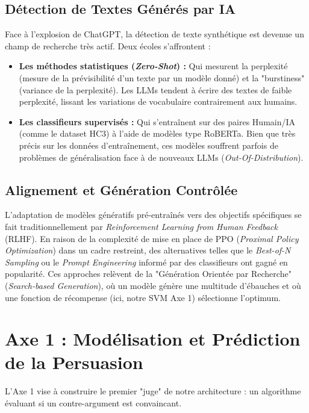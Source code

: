 \documentclass[11pt,a4paper]{article}
\begin{document}
\subsection{Détection de Textes Générés par IA}
Face à l'explosion de ChatGPT, la détection de texte synthétique est devenue un champ de recherche très actif. Deux écoles s'affrontent :
\begin{itemize}
    \item \textbf{Les méthodes statistiques (\textit{Zero-Shot}) :} Qui mesurent la perplexité (mesure de la prévisibilité d'un texte par un modèle donné) et la "burstiness" (variance de la perplexité). Les LLMs tendent à écrire des textes de faible perplexité, lissant les variations de vocabulaire contrairement aux humains.
    \item \textbf{Les classifieurs supervisés :} Qui s'entraînent sur des paires Humain/IA (comme le dataset HC3) à l'aide de modèles type RoBERTa. Bien que très précis sur les données d'entraînement, ces modèles souffrent parfois de problèmes de généralisation face à de nouveaux LLMs (\textit{Out-Of-Distribution}).
\end{itemize}

\subsection{Alignement et Génération Contrôlée}
L'adaptation de modèles génératifs pré-entraînés vers des objectifs spécifiques se fait traditionnellement par \textit{Reinforcement Learning from Human Feedback} (RLHF). En raison de la complexité de mise en place de PPO (\textit{Proximal Policy Optimization}) dans un cadre restreint, des alternatives telles que le \textit{Best-of-N Sampling} ou le \textit{Prompt Engineering} informé par des classifieurs ont gagné en popularité. Ces approches relèvent de la "Génération Orientée par Recherche" (\textit{Search-based Generation}), où un modèle génère une multitude d'ébauches et où une fonction de récompense (ici, notre SVM Axe 1) sélectionne l'optimum.


\section{Axe 1 : Modélisation et Prédiction de la Persuasion}

L'Axe 1 vise à construire le premier "juge" de notre architecture : un algorithme évaluant si un contre-argument est convaincant.
\end{document}
